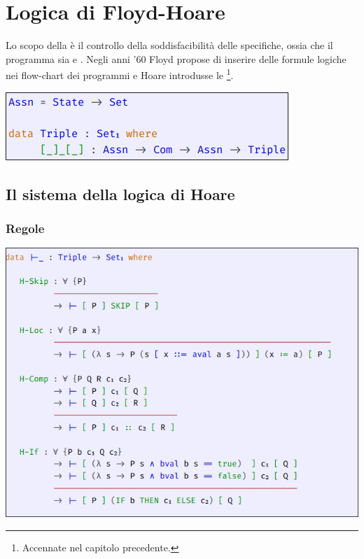 \chapter{Logica di Floyd-Hoare}

Lo scopo della  è il controllo della soddisfacibilità delle specifiche, ossia che il programma sia  e . Negli anni '60 Floyd propose di inserire delle formule logiche nei flow-chart dei programmi e Hoare introdusse le \footnote{Accennate nel capitolo precedente.}.

\begin{center}
 \includegraphics[scale = 0.5]{images/IMP/Assn.png}
\end{center}


\section{Il sistema della logica di Hoare}


\subsection{Regole}

\begin{center}
 \includegraphics[scale = 0.4]{images/IMP/T1}
\end{center}

